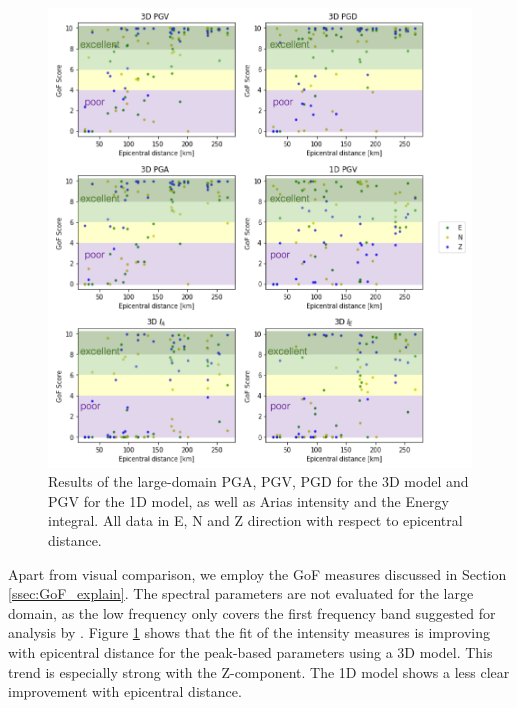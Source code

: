 \documentclass[../Text/00main.tex]{subfiles}
\begin{document}
\begin{figure}
    \centering
    \includegraphics[width=.7\linewidth]{images_results/gofepicentral.png}
    \caption{Results of the large-domain PGA, PGV, PGD for the 3D model and PGV for the 1D model, as well as Arias intensity and the Energy integral. All data in E, N and Z direction with respect to epicentral distance.}
    \label{fig:gofpot_epicentral_large}
\end{figure}

 Apart from visual comparison, we employ the GoF measures discussed in Section \ref{ssec:GoF_explain}. The spectral parameters are not evaluated for the large domain, as the low frequency only covers the first frequency band suggested for analysis by \citet{anderson_quantitative_nodate}. Figure \ref{fig:gofpot_epicentral_large} shows that the fit of the intensity measures is improving with epicentral distance for the peak-based parameters using a 3D model. This trend is especially strong with the Z-component. The 1D model shows a less clear improvement with epicentral distance. %
\end{document}
